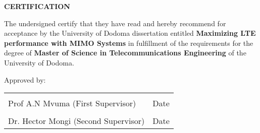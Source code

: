 \begin{center}
{\large \textbf{CERTIFICATION}} \\
\vspace{1in}
\end{center}
The undersigned certify that they have read and hereby recommend for acceptance by the University of Dodoma dissertation entitled \textbf{Maximizing LTE performance with MIMO Systems} in fulfillment of the requirements for the degree of \textbf{Master of Science in Telecommunications Engineering} of the University of Dodoma.	

\vspace{1in}
\begin{center}
Approved by: 
\bigbreak
\noindent\begin{tabular}{ll}
	\makebox[2.5in]{\hrulefill} & \makebox[2.5in]{\hrulefill}\\
	Prof A.N Mvuma (First Supervisor) & Date\\[8ex]%
	\makebox[2.5in]{\hrulefill} & \makebox[2.5in]{\hrulefill}\\
	Dr. Hector Mongi (Second Supervisor) & Date\\
\end{tabular}
\end{center}
\newpage